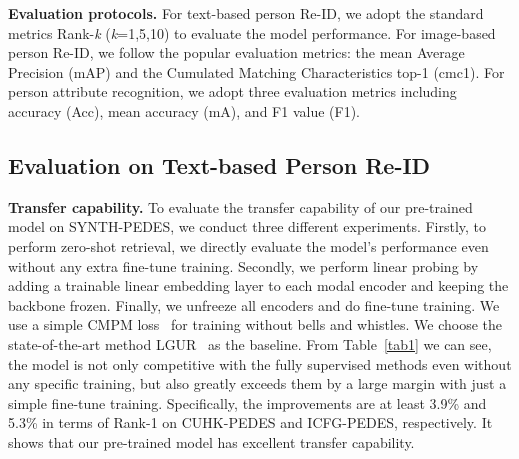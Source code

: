 \documentclass[10pt,twocolumn,letterpaper]{article}
\begin{document}
\noindent\textbf{Evaluation protocols.} For text-based person Re-ID, we adopt the standard metrics Rank-\textit{k} (\textit{k}=1,5,10) to evaluate the model performance. For image-based person Re-ID, we follow the popular evaluation metrics: the mean Average Precision (mAP) and the Cumulated Matching Characteristics top-1 (cmc1). For person attribute recognition, we adopt three evaluation metrics including accuracy (Acc), mean accuracy (mA), and F1 value (F1).

\subsection{Evaluation on Text-based Person Re-ID}
\noindent\textbf{Transfer capability.} To evaluate the transfer capability of our pre-trained model on SYNTH-PEDES, we conduct three different experiments. Firstly, to perform zero-shot retrieval, we directly evaluate the model's performance even without any extra fine-tune training. Secondly, we perform linear probing by adding a trainable linear embedding layer to each modal encoder and keeping the backbone frozen. Finally, we unfreeze all encoders and do fine-tune training. We use a simple CMPM loss~\cite{CMPM} for training without bells and whistles. We choose the state-of-the-art method LGUR~\cite{LGUR} as the baseline. From Table~\ref{tab1} we can see, the model is not only competitive with the fully supervised methods even without any specific training, but also greatly exceeds them by a large margin with just a simple fine-tune training. Specifically, the improvements are at least 3.9\% and 5.3\% in terms of Rank-1 on CUHK-PEDES and ICFG-PEDES, respectively. It shows that our pre-trained model has excellent transfer capability.
\end{document}
